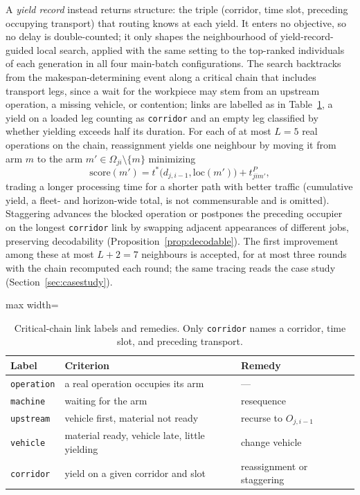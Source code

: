\documentclass[preprint,review,12pt,authoryear]{elsarticle}
\begin{document}
A \emph{yield record} instead returns structure: the triple (corridor, time slot, preceding occupying transport) that routing knows at each yield.
It enters no objective, so no delay is double-counted; it only shapes the neighbourhood of yield-record-guided local search, applied with the same setting to the top-ranked individuals of each generation in all four main-batch configurations.
The search backtracks from the makespan-determining event along a critical chain that includes transport legs, since a wait for the workpiece may stem from an upstream operation, a missing vehicle, or contention; links are labelled as in Table~\ref{tab:attrib}, a yield on a loaded leg counting as \texttt{corridor} and an empty leg classified by whether yielding exceeds half its duration.
For each of at most $L=5$ real operations on the chain, reassignment yields one neighbour by moving it from arm $m$ to the arm $m'\in\Omega_{ji}\setminus\{m\}$ minimizing
\begin{equation}
\label{eq:reassign}
\mathrm{score}(m')=t^{*}\bigl(d_{j,i-1},\mathrm{loc}(m')\bigr)+t^{P}_{jim'},
\end{equation}
trading a longer processing time for a shorter path with better traffic (cumulative yield, a fleet- and horizon-wide total, is not commensurable and is omitted).
Staggering advances the blocked operation or postpones the preceding occupier on the longest \texttt{corridor} link by swapping adjacent appearances of different jobs, preserving decodability (Proposition~\ref{prop:decodable}).
The first improvement among these at most $L+2=7$ neighbours is accepted, for at most three rounds with the chain recomputed each round; the same tracing reads the case study (Section~\ref{sec:casestudy}).

\begin{table}[!htbp]
\caption{Critical-chain link labels and remedies. Only \texttt{corridor} names a corridor, time slot, and preceding transport.}
\label{tab:attrib}
\footnotesize
\begin{adjustbox}{max width=\linewidth}\begin{tabular}{@{}llp{2.3cm}@{}}
\toprule
Label & Criterion & Remedy \\
\midrule
\texttt{operation} & a real operation occupies its arm & --- \\
\texttt{machine} & waiting for the arm & resequence \\
\texttt{upstream} & vehicle first, material not ready & recurse to $O_{j,i-1}$ \\
\texttt{vehicle} & material ready, vehicle late, little yielding & change vehicle \\
\texttt{corridor} & yield on a given corridor and slot & reassignment or staggering \\
\bottomrule
\end{tabular}\end{adjustbox}
\end{table}
\end{document}

